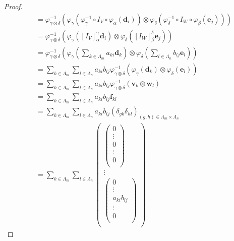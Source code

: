 \documentclass[dvipdfmx]{jsarticle}
\begin{document}
\begin{proof}
\begin{align*}
&= \varphi_{\gamma \otimes \delta}^{- 1}\left( \varphi_{\gamma}\left( \varphi_{\gamma}^{- 1} \circ I_{V} \circ \varphi_{\alpha}\left( \mathbf{d}_{i} \right) \right) \otimes \varphi_{\delta}\left( \varphi_{\delta}^{- 1} \circ I_{W} \circ \varphi_{\beta}\left( \mathbf{e}_{j} \right) \right) \right)\\
&= \varphi_{\gamma \otimes \delta}^{- 1}\left( \varphi_{\gamma}\left( \left[ I_{V} \right]^{\gamma}_{\alpha}\mathbf{d}_{i} \right) \otimes \varphi_{\delta}\left( \left[ I_{W} \right]^{\delta}_{\beta}\mathbf{e}_{j} \right) \right)\\
&= \varphi_{\gamma \otimes \delta}^{- 1}\left( \varphi_{\gamma}\left( \sum_{k \in \varLambda_{m}} {a_{ki}\mathbf{d}_{k}} \right) \otimes \varphi_{\delta}\left( \sum_{l \in \varLambda_{n}} {b_{lj}\mathbf{e}_{l}} \right) \right)\\
&= \sum_{k \in \varLambda_{m}} {\sum_{l \in \varLambda_{n}} {a_{ki}b_{lj}\varphi_{\gamma \otimes \delta}^{- 1}\left( \varphi_{\gamma}\left( \mathbf{d}_{k} \right) \otimes \varphi_{\delta}\left( \mathbf{e}_{l} \right) \right)}}\\
&= \sum_{k \in \varLambda_{m}} {\sum_{l \in \varLambda_{n}} {a_{ki}b_{lj}\varphi_{\gamma \otimes \delta}^{- 1}\left( \mathbf{v}_{k} \otimes \mathbf{w}_{l} \right)}}\\
&= \sum_{k \in \varLambda_{m}} {\sum_{l \in \varLambda_{n}} {a_{ki}b_{lj}\mathbf{f}_{kl}}}\\
&= \sum_{k \in \varLambda_{m}} {\sum_{l \in \varLambda_{n}} {a_{ki}b_{lj}\left( \delta_{gk}\delta_{hl} \right)_{(g,h) \in \varLambda_{m} \times \varLambda_{n}}}}\\
&= \sum_{k \in \varLambda_{m}} {\sum_{l \in \varLambda_{n}} \begin{pmatrix}
\begin{pmatrix}
0 \\
 \vdots \\
0 \\
 \vdots \\
0 \\
\end{pmatrix} \\
 \vdots \\
\begin{pmatrix}
0 \\
 \vdots \\
a_{ki}b_{lj} \\
 \vdots \\
0 \\
\end{pmatrix} \\

\end{pmatrix}}
\end{align*}
\end{proof}
\end{document}
